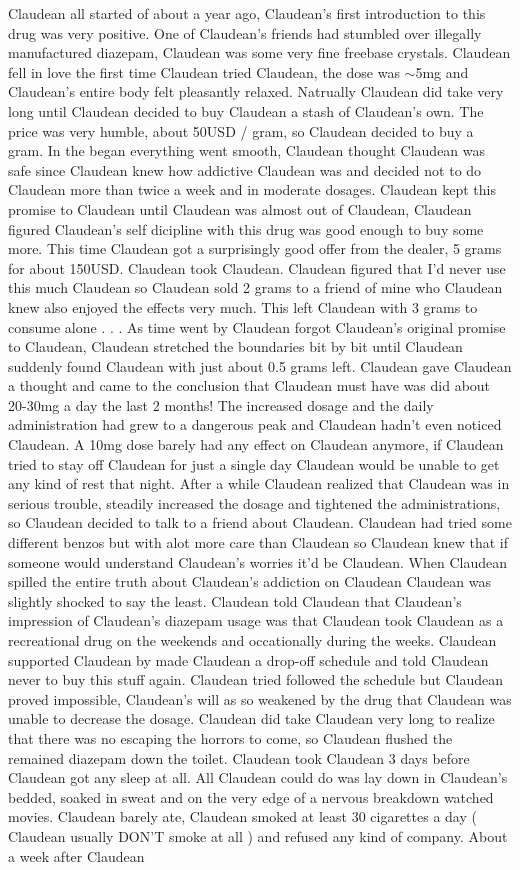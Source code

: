 \documentclass[12pt]{book}
\begin{document}
Claudean all started of about a year ago, Claudean's first introduction to this drug was very positive. One of Claudean's friends had stumbled over illegally manufactured diazepam, Claudean was some very fine freebase crystals. Claudean fell in love the first time Claudean tried Claudean, the dose was $\sim$5mg and Claudean's entire body felt pleasantly relaxed. Natrually Claudean did take very long until Claudean decided to buy Claudean a stash of Claudean's own. The price was very humble, about 50USD / gram, so Claudean decided to buy a gram. In the began everything went smooth, Claudean thought Claudean was safe since Claudean knew how addictive Claudean was and decided not to do Claudean more than twice a week and in moderate dosages. Claudean kept this promise to Claudean until Claudean was almost out of Claudean, Claudean figured Claudean's self dicipline with this drug was good enough to buy some more. This time Claudean got a surprisingly good offer from the dealer, 5 grams for about 150USD. Claudean took Claudean. Claudean figured that I'd never use this much Claudean so Claudean sold 2 grams to a friend of mine who Claudean knew also enjoyed the effects very much. This left Claudean with 3 grams to consume alone . . .  As time went by Claudean forgot Claudean's original promise to Claudean, Claudean stretched the boundaries bit by bit until Claudean suddenly found Claudean with just about 0.5 grams left. Claudean gave Claudean a thought and came to the conclusion that Claudean must have was did about 20-30mg a day the last 2 months! The increased dosage and the daily administration had grew to a dangerous peak and Claudean hadn't even noticed Claudean. A 10mg dose barely had any effect on Claudean anymore, if Claudean tried to stay off Claudean for just a single day Claudean would be unable to get any kind of rest that night. After a while Claudean realized that Claudean was in serious trouble, steadily increased the dosage and tightened the administrations, so Claudean decided to talk to a friend about Claudean. Claudean had tried some different benzos but with alot more care than Claudean so Claudean knew that if someone would understand Claudean's worries it'd be Claudean. When Claudean spilled the entire truth about Claudean's addiction on Claudean Claudean was slightly shocked to say the least. Claudean told Claudean that Claudean's impression of Claudean's diazepam usage was that Claudean took Claudean as a recreational drug on the weekends and occationally during the weeks. Claudean supported Claudean by made Claudean a drop-off schedule and told Claudean never to buy this stuff again. Claudean tried followed the schedule but Claudean proved impossible, Claudean's will as so weakened by the drug that Claudean was unable to decrease the dosage. Claudean did take Claudean very long to realize that there was no escaping the horrors to come, so Claudean flushed the remained diazepam down the toilet. Claudean took Claudean 3 days before Claudean got any sleep at all. All Claudean could do was lay down in Claudean's bedded, soaked in sweat and on the very edge of a nervous breakdown watched movies. Claudean barely ate, Claudean smoked at least 30 cigarettes a day ( Claudean usually DON'T smoke at all ) and refused any kind of company. About a week after Claudean 
\end{document}
